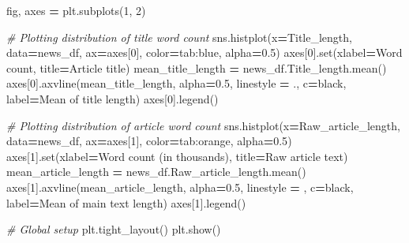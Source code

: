 \documentclass[a4paper, oneside]{report}
\newenvironment{Shaded}{\begin{snugshade}}{\end{snugshade}}
\newcommand{\BuiltInTok}[1]{#1}
\newcommand{\CommentTok}[1]{\textcolor[rgb]{0.56,0.35,0.01}{\textit{#1}}}
\newcommand{\DecValTok}[1]{\textcolor[rgb]{0.00,0.00,0.81}{#1}}
\newcommand{\FloatTok}[1]{\textcolor[rgb]{0.00,0.00,0.81}{#1}}
\newcommand{\NormalTok}[1]{#1}
\newcommand{\OperatorTok}[1]{\textcolor[rgb]{0.81,0.36,0.00}{\textbf{#1}}}
\newcommand{\StringTok}[1]{\textcolor[rgb]{0.31,0.60,0.02}{#1}}
\renewenvironment{Shaded}
{
  \vspace{4pt}%
  \begin{snugshade}%
}{%
  \end{snugshade}%
  \vspace{4pt}%
}
\begin{document}
\begin{Shaded}
\begin{Highlighting}[]
\NormalTok{fig, axes }\OperatorTok{=}\NormalTok{ plt.subplots(}\DecValTok{1}\NormalTok{, }\DecValTok{2}\NormalTok{)}

\CommentTok{\# Plotting distribution of title word count}
\NormalTok{sns.histplot(x}\OperatorTok{=}\StringTok{\textquotesingle{}Title\_length\textquotesingle{}}\NormalTok{, data}\OperatorTok{=}\NormalTok{news\_df, ax}\OperatorTok{=}\NormalTok{axes[}\DecValTok{0}\NormalTok{], color}\OperatorTok{=}\StringTok{\textquotesingle{}tab:blue\textquotesingle{}}\NormalTok{, alpha}\OperatorTok{=}\FloatTok{0.5}\NormalTok{)}
\NormalTok{axes[}\DecValTok{0}\NormalTok{].}\BuiltInTok{set}\NormalTok{(xlabel}\OperatorTok{=}\StringTok{\textquotesingle{}Word count\textquotesingle{}}\NormalTok{, title}\OperatorTok{=}\StringTok{\textquotesingle{}Article title\textquotesingle{}}\NormalTok{)}
\NormalTok{mean\_title\_length }\OperatorTok{=}\NormalTok{ news\_df.Title\_length.mean()}
\NormalTok{axes[}\DecValTok{0}\NormalTok{].axvline(mean\_title\_length, alpha}\OperatorTok{=}\FloatTok{0.5}\NormalTok{, linestyle }\OperatorTok{=} \StringTok{\textquotesingle{}{-}.\textquotesingle{}}\NormalTok{, c}\OperatorTok{=}\StringTok{\textquotesingle{}black\textquotesingle{}}\NormalTok{, label}\OperatorTok{=}\StringTok{\textquotesingle{}Mean of title length\textquotesingle{}}\NormalTok{)}
\NormalTok{axes[}\DecValTok{0}\NormalTok{].legend()}

\CommentTok{\# Plotting distribution of article word count}
\NormalTok{sns.histplot(x}\OperatorTok{=}\StringTok{\textquotesingle{}Raw\_article\_length\textquotesingle{}}\NormalTok{, data}\OperatorTok{=}\NormalTok{news\_df, ax}\OperatorTok{=}\NormalTok{axes[}\DecValTok{1}\NormalTok{], color}\OperatorTok{=}\StringTok{\textquotesingle{}tab:orange\textquotesingle{}}\NormalTok{, alpha}\OperatorTok{=}\FloatTok{0.5}\NormalTok{)}
\NormalTok{axes[}\DecValTok{1}\NormalTok{].}\BuiltInTok{set}\NormalTok{(xlabel}\OperatorTok{=}\StringTok{\textquotesingle{}Word count (in thousands)\textquotesingle{}}\NormalTok{, title}\OperatorTok{=}\StringTok{\textquotesingle{}Raw article text\textquotesingle{}}\NormalTok{)}
\NormalTok{mean\_article\_length }\OperatorTok{=}\NormalTok{ news\_df.Raw\_article\_length.mean()}
\NormalTok{axes[}\DecValTok{1}\NormalTok{].axvline(mean\_article\_length, alpha}\OperatorTok{=}\FloatTok{0.5}\NormalTok{, linestyle }\OperatorTok{=} \StringTok{\textquotesingle{}{-}{-}\textquotesingle{}}\NormalTok{, c}\OperatorTok{=}\StringTok{\textquotesingle{}black\textquotesingle{}}\NormalTok{, label}\OperatorTok{=}\StringTok{\textquotesingle{}Mean of main text length\textquotesingle{}}\NormalTok{)}
\NormalTok{axes[}\DecValTok{1}\NormalTok{].legend()}

\CommentTok{\# Global setup}
\NormalTok{plt.tight\_layout()}
\NormalTok{plt.show()}
\end{Highlighting}
\end{Shaded}
\end{document}
